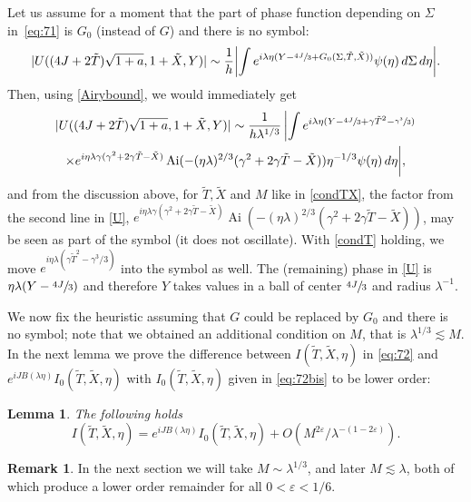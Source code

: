 \documentclass[11pt]{article}
\let\epsilon\varepsilon
\DeclareMathOperator{\Ai}{Ai}
\theoremstyle{plain}
\newtheorem{lemma}{Lemma}
\theoremstyle{definition}
\newtheorem{rmq}{Remark}[section]
\begin{document}
Let us assume for a moment that the part of phase function depending on $\Sigma$ in~\eqref{eq:71} is $G_0$ (instead of $G$) and there is no symbol: 
\[
|U((4J+2\tilde T)\sqrt{1+a},1+\tilde X,Y)| \sim \frac 1h \biggl| \int e^{i\lambda\eta (Y-\sfrac{4J}{3}+G_0(\Sigma,\tilde T,\tilde X))}\psi(\eta) \,d\Sigma \,d\eta \biggr|.
\]
Then, using \eqref{Airybound}, we would immediately get
\begin{multline}\label{U}
|U((4J+2\tilde T)\sqrt{1+a},1+\tilde X,Y)|\sim \frac{1}{h\lambda^{1/3}}\,\biggl|\int e^{i\lambda\eta (Y-\sfrac{4J}{3}+\gamma \tilde T^2-\sfrac{\gamma^3}{3})}\\\times e^{i\eta \lambda \gamma(\gamma^2+2\gamma \tilde T-\tilde X)}\Ai(-(\eta\lambda)^{2/3}(\gamma^2+2\gamma \tilde T-\tilde X))\eta^{-1/3}\psi(\eta)\,d\eta\biggr|,
\end{multline}
and from the discussion above, for $\tilde T,\tilde X$ and $M$ like in \eqref{condTX}, the factor from the second line in \eqref{U},
$e^{i\eta \lambda \gamma(\gamma^2+2\gamma \tilde T-\tilde X)}\Ai(-(\eta\lambda)^{2/3}(\gamma^2+2\gamma \tilde T-\tilde X))$, may be seen as part of the symbol (it does not oscillate). With \eqref{condT} holding, we move $e^{i\eta \lambda(\gamma \tilde T^2-\gamma^3/3)}$ into the symbol as well.
The (remaining) phase in \eqref{U} is $\eta \lambda (Y-\sfrac{4J}{3})$ and therefore $Y$ takes values in a ball of center $\sfrac{4J}{3}$ and radius $\lambda^{-1}$.

We now fix the heuristic assuming that $G$ could be replaced by $G_0$ and there is no symbol; note that we obtained an additional condition on $M$, that is $\lambda^{1/3}\lesssim M$. In the next lemma we prove the difference between $I(\tilde T,\tilde X,\eta)$ in \eqref{eq:72} and $e^{iJB(\lambda\eta)} I_0(\tilde T,\tilde X,\eta)$ with $I_0(\tilde T,\tilde X,\eta)$ given in \eqref{eq:72bis} to be lower order:
\begin{lemma}
The following holds
\[
I(\tilde T,\tilde X,\eta)=e^{iJB(\lambda\eta)}I_0(\tilde T,\tilde X,\eta)+O(M^{2\epsilon}/\lambda^{-(1-2\epsilon)}).
\]
\end{lemma}
\begin{rmq}
In the next section we will take $M\sim \lambda^{1/3}$, and later $M\lesssim \lambda$, both of which produce a lower order remainder for all $0<\epsilon<1/6$.
\end{rmq}
\end{document}
